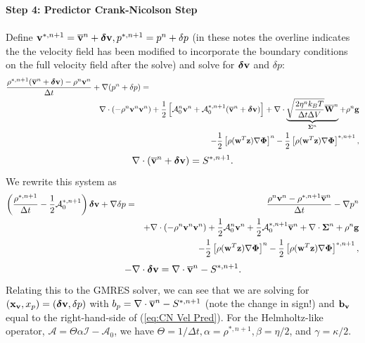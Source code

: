 \documentclass[final]{siamltex}
\def\bb {{\bf b}}
\def\gb {{\bf g}}
\def\vb {{\bf v}}
\def\wb {{\bf w}}
\def\Wb {{\bf W}}
\def\xb {{\bf x}}
\def\zb {{\bf z}}
\def\deltab {\boldsymbol{\delta}}
\def\Phib   {\boldsymbol{\Phi}}
\def\Sigmab {\boldsymbol{\Sigma}}
\def\half   {\frac{1}{2}}
\begin{document}
{\bf Step 4: Predictor Crank-Nicolson Step}\\ \\
Define $\vb^{*,n+1} = \overline\vb^n + \deltab\vb, p^{*,n+1} = p^n + \delta p$ (in these notes the overline
indicates the the velocity field has been modified to incorporate the boundary conditions on the
full velocity field after the solve) and solve
for $\deltab\vb$ and $\delta p$:
\begin{eqnarray}
\frac{\rho^{*,n+1}(\overline\vb^n + \deltab\vb) - \rho^n\vb^n}{\Delta t} + \nabla(p^n+\delta p) &=&\nonumber\\
&&\hspace{-1in}\nabla\cdot(-\rho^n\vb^n\vb^n) + \half\left[\mathcal{A}_0^n\vb^n + \mathcal{A}_0^{*,n+1}(\overline\vb^n + \deltab\vb)\right] + \nabla\cdot\underbrace{\sqrt{\frac{2\eta^n k_B T}{\Delta t\Delta V}}\overline\Wb^n}_{\Sigmab^n} + \rho^n\gb\nonumber\\
&&\hspace{-1in} - \half\left[\rho(\wb^T\zb)\nabla\Phib\right]^n - \half\left[\rho(\wb^T\zb)\nabla\Phib\right]^{*,n+1},
\end{eqnarray}
\begin{equation}
\nabla\cdot(\overline\vb^n+\deltab\vb) = S^{*,n+1}.
\end{equation}
We rewrite this system as
\begin{eqnarray}
\left(\frac{\rho^{*,n+1}}{\Delta t} - \half\mathcal{A}_0^{*,n+1}\right)\deltab\vb + \nabla\delta p &=& \frac{\rho^n\vb^n-\rho^{*,n+1}\overline\vb^n}{\Delta t} -\nabla p^n\nonumber\\
&&+ \nabla\cdot(-\rho^n\vb^n\vb^n) + \half\mathcal{A}_0^n\vb^n + \half\mathcal{A}_0^{*,n+1}\overline\vb^n + \nabla\cdot\Sigmab^n + \rho^n\gb\nonumber\\
&&- \half\left[\rho(\wb^T\zb)\nabla\Phib\right]^n - \half\left[\rho(\wb^T\zb)\nabla\Phib\right]^{*,n+1},\label{eq:CN Vel Pred}
\end{eqnarray}
\begin{equation}
-\nabla\cdot\deltab\vb = \nabla\cdot\overline\vb^n - S^{*,n+1}.
\end{equation}
Relating this to the GMRES solver, we can see that we are solving for 
$(\xb_\vb,x_p) = (\deltab\vb,\delta p)$ with $b_p = \nabla\cdot\overline\vb^n-S^{*,n+1}$ (note the change in sign!) 
and $\bb_\vb$ equal to the right-hand-side of (\ref{eq:CN Vel Pred}).  For the Helmholtz-like operator, 
$\mathcal{A}=\Theta\alpha\mathcal{I} - \mathcal{A}_0$, we have $\Theta=1/\Delta t, \alpha=\rho^{*,n+1}, 
\beta=\eta/2$, and $\gamma=\kappa/2$.
\end{document}
